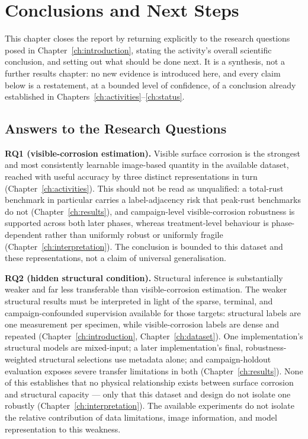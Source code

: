 \chapter{Conclusions and Next Steps}
\label{ch:conclusions}

This chapter closes the report by returning explicitly to the research
questions posed in Chapter~\ref{ch:introduction}, stating the activity's
overall scientific conclusion, and setting out what should be done next.
It is a synthesis, not a further results chapter: no new evidence is
introduced here, and every claim below is a restatement, at a bounded
level of confidence, of a conclusion already established in
Chapters~\ref{ch:activities}--\ref{ch:status}.

\section{Answers to the Research Questions}
\label{sec:conclusions-rq}

\textbf{RQ1 (visible-corrosion estimation).} Visible surface corrosion is
the strongest and most consistently learnable image-based quantity in the
available dataset, reached with useful accuracy by three distinct
representations in turn (Chapter~\ref{ch:activities}). This should not be
read as unqualified: a total-rust benchmark in particular carries a
label-adjacency risk that peak-rust benchmarks do not
(Chapter~\ref{ch:results}), and campaign-level visible-corrosion
robustness is supported across both later phases, whereas treatment-level
behaviour is phase-dependent rather than uniformly robust or uniformly
fragile (Chapter~\ref{ch:interpretation}). The conclusion is bounded to
this dataset and these representations, not a claim of universal
generalisation.

\textbf{RQ2 (hidden structural condition).} Structural inference is
substantially weaker and far less transferable than visible-corrosion
estimation. The weaker structural results must be interpreted in light of
the sparse, terminal, and campaign-confounded supervision available for
those targets: structural labels are one measurement per specimen, while
visible-corrosion labels are dense and repeated
(Chapter~\ref{ch:introduction}, Chapter~\ref{ch:dataset}). One
implementation's structural models are mixed-input; a later
implementation's final, robustness-weighted structural selections use
metadata alone; and campaign-holdout evaluation exposes severe transfer
limitations in both (Chapter~\ref{ch:results}). None of this establishes
that no physical relationship exists between surface corrosion and
structural capacity — only that this dataset and design do not isolate one
robustly (Chapter~\ref{ch:interpretation}). The available experiments do
not isolate the relative contribution of data limitations, image
information, and model representation to this weakness.

